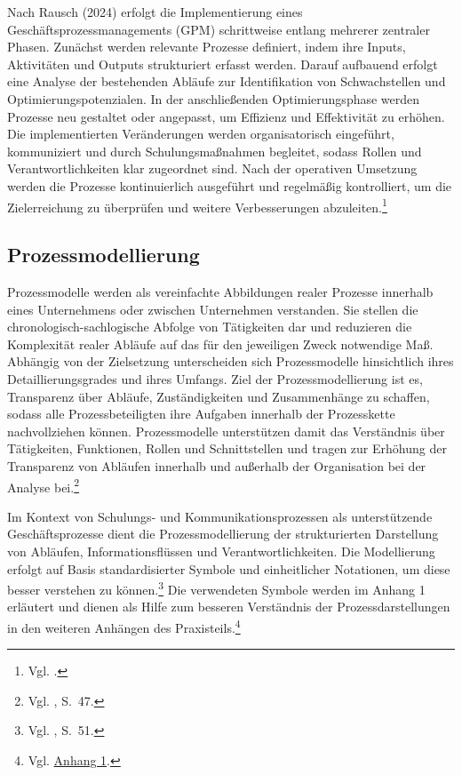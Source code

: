 \documentclass[
    12pt, 
    a4paper,
    ]{scrartcl} %
\begin{document}
Nach Rausch (2024) erfolgt die Implementierung eines Geschäftsprozessmanagements (GPM) schrittweise entlang mehrerer zentraler Phasen. Zunächst werden relevante Prozesse definiert, indem ihre Inputs, Aktivitäten und Outputs strukturiert erfasst werden. Darauf aufbauend erfolgt eine Analyse der bestehenden Abläufe zur Identifikation von Schwachstellen und Optimierungspotenzialen. In der anschließenden Optimierungsphase werden Prozesse neu gestaltet oder angepasst, um Effizienz und Effektivität zu erhöhen. Die implementierten Veränderungen werden organisatorisch eingeführt, kommuniziert und durch Schulungsmaßnahmen begleitet, sodass Rollen und Verantwortlichkeiten klar zugeordnet sind. Nach der operativen Umsetzung werden die Prozesse kontinuierlich ausgeführt und regelmäßig kontrolliert, um die Zielerreichung zu überprüfen und weitere Verbesserungen abzuleiten.\footnote{Vgl. \cite{Boc_Group}.}

\subsection{Prozessmodellierung}
Prozessmodelle werden als vereinfachte Abbildungen realer Prozesse innerhalb eines Unternehmens oder zwischen Unternehmen verstanden. Sie stellen die chronologisch-sachlogische Abfolge von Tätigkeiten dar und reduzieren die Komplexität realer Abläufe auf das für den jeweiligen Zweck notwendige Maß. Abhängig von der Zielsetzung unterscheiden sich Prozessmodelle hinsichtlich ihres Detaillierungsgrades und ihres Umfangs. Ziel der Prozessmodellierung ist es, Transparenz über Abläufe, Zuständigkeiten und Zusammenhänge zu schaffen, sodass alle Prozessbeteiligten ihre Aufgaben innerhalb der Prozesskette nachvollziehen können. Prozessmodelle unterstützen damit das Verständnis über Tätigkeiten, Funktionen, Rollen und Schnittstellen und tragen zur Erhöhung der Transparenz von Abläufen innerhalb und außerhalb der Organisation bei der Analyse bei.\footnote{Vgl. \cite{Koch_Geschaeftsprozessmanagement}, S.~47.}

Im Kontext von Schulungs- und Kommunikationsprozessen als unterstützende Geschäftsprozesse dient die Prozessmodellierung der strukturierten Darstellung von Abläufen, Informationsflüssen und Verantwortlichkeiten. Die Modellierung erfolgt auf Basis standardisierter Symbole und einheitlicher Notationen, um diese besser verstehen zu können.\footnote{Vgl. \cite{Koch_Geschaeftsprozessmanagement}, S.~51.} Die verwendeten Symbole werden im Anhang 1 erläutert und dienen als Hilfe zum besseren Verständnis der Prozessdarstellungen in den weiteren Anhängen des Praxisteils.\footnote{Vgl. \hyperref[sec:Anhang1]{Anhang 1}.}
\end{document}
